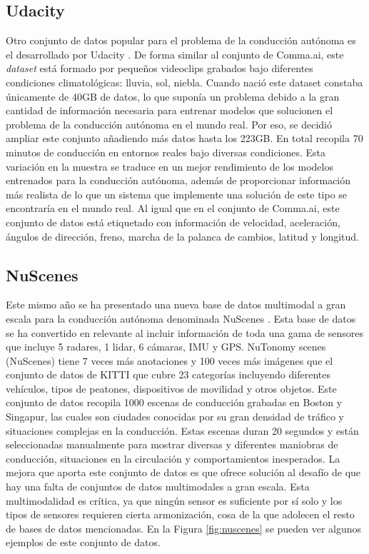 \subsection{Udacity}

Otro conjunto de datos popular para el problema de la conducción autónoma es el desarrollado por Udacity \cite{udacity-data}. De forma similar al conjunto de Comma.ai, este \textit{dataset} está formado por pequeños videoclips grabados bajo diferentes condiciones climatológicas: lluvia, sol, niebla.  Cuando nació este dataset constaba únicamente de 40GB de datos, lo que suponía un problema debido a la gran cantidad de información necesaria para entrenar modelos que solucionen el problema de la conducción autónoma en el mundo real. Por eso, se decidió ampliar este conjunto añadiendo más datos hasta los 223GB. En total recopila 70 minutos de conducción en entornos reales bajo diversas condiciones. Esta variación en la muestra se traduce en un mejor rendimiento de los modelos entrenados para la conducción autónoma, además de proporcionar información más realista de lo que un sistema que implemente una solución de este tipo se encontraría en el mundo real. Al igual que en el conjunto de Comma.ai, este conjunto de datos está etiquetado con información de velocidad, aceleración, ángulos de dirección, freno, marcha de la palanca de cambios, latitud y longitud.

\subsection {NuScenes}

Este mismo año se ha presentado una nueva base de datos multimodal a gran escala para la conducción autónoma denominada NuScenes \cite{nuscenes-dataset}. Esta base de datos se ha convertido en relevante al incluir información de toda una gama de sensores que incluye 5 radares, 1 lidar, 6 cámaras, IMU y GPS. NuTonomy scenes (NuScenes) tiene 7 veces más anotaciones y 100 veces más imágenes que el conjunto de datos de KITTI \cite{kitti-sim} que cubre 23 categorías incluyendo diferentes vehículos, tipos de peatones, dispositivos de movilidad y otros objetos.
Este conjunto de datos recopila 1000 escenas de conducción grabadas en Boston y Singapur, las cuales son ciudades conocidas por su gran densidad de tráfico y situaciones complejas en la conducción. Estas escenas duran 20 segundos y están seleccionadas manualmente para mostrar diversas y diferentes maniobras de conducción, situaciones en la circulación y comportamientos inesperados.
La mejora que aporta este conjunto de datos es que ofrece solución al desafío de que hay una falta de conjuntos de datos multimodales a gran escala. Esta multimodalidad es crítica, ya que ningún sensor es suficiente por sí solo y los tipos de sensores requieren cierta armonización, cosa de la que adolecen el resto de bases de datos mencionadas. En la Figura \ref{fig:nuscenes} se pueden ver algunos ejemplos de este conjunto de datos.

